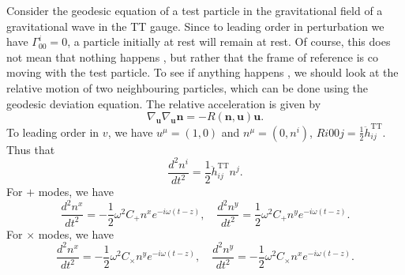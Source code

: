 \noindent
Consider the geodesic equation of a test particle in the gravitational field of a gravitational wave in the TT gauge. Since to leading order in perturbation we have $\Gamma^i_{00} = 0$, a particle initially at rest will remain at rest.
Of course, this does not mean that nothing happens , but rather that the frame of reference is co moving with the test particle. To see if anything happens , we should look at the relative motion of two neighbouring particles, which can be done using the geodesic deviation equation. The relative acceleration is given by
\[\nabla_{\bm{u}} \nabla_{\bm{u}} \bm{n} = -R(\bm{n},\bm{u}) \bm{u}.\]
To leading order in $v$, we have $u^{\mu} = (1,0)$ and $n^{\mu} = (0,n^i)$, $R{i00j} = \frac{1}{2}\ddot{h}_{ij}^{\mathrm{TT}}$. Thus that
\[\frac{d^2n^i}{dt^2} = \frac{1}{2} \ddot{h}_{ij} ^{\mathrm{TT}} n^j.\]
For $+$ modes, we have
\[\frac{d^2n^x}{dt^2} = - \frac{1}{2}\omega^2 C_{+}n^x e^{-i\omega(t-z)}, \quad \frac{d^2n^y}{dt^2} = \frac{1}{2}\omega^2 C_{+}n^y e^{-i\omega(t-z)}.\]
For $\times$ modes, we have
\[\frac{d^2n^x}{dt^2} = - \frac{1}{2}\omega^2 C_{\times}n^y e^{-i\omega(t-z)}, \quad \frac{d^2n^y}{dt^2} = - \frac{1}{2}\omega^2 C_{\times}n^x e^{-i\omega(t-z)}.\]


